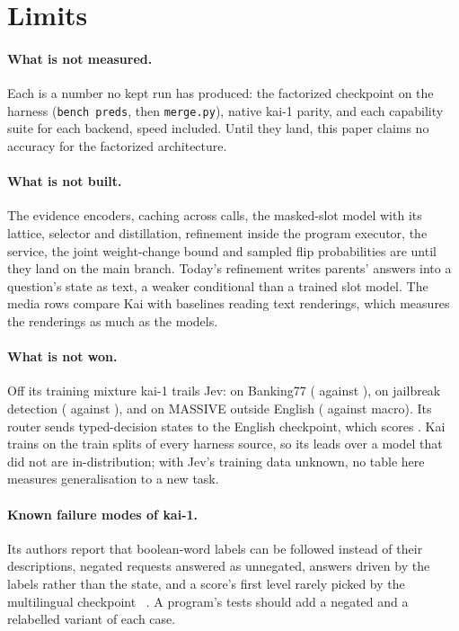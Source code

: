\section{Limits}
\label{sec:limits}

\paragraph{What is not measured.}
Each \ph{} is a number no kept run has produced: the factorized checkpoint on
the harness (\texttt{bench preds}, then \texttt{merge.py}), native kai-1
parity, and each capability suite for each backend, speed included. Until they land, this paper claims no
accuracy for the factorized architecture.

\paragraph{What is not built.}
The evidence encoders, caching across calls, the masked-slot model with its
lattice, selector and distillation, refinement inside the program executor, the
 service, the joint weight-change bound and sampled flip
probabilities are \proposed{} until they land on the main branch. Today's refinement writes
parents' answers into a question's state as text, a weaker conditional than a
trained slot model. The media rows compare Kai with baselines reading text
renderings, which measures the renderings as much as the models.

\paragraph{What is not won.}
Off its training mixture kai-1 trails Jev: on Banking77 ( against
), on jailbreak detection
( against
), and on MASSIVE outside English
( against
 macro). Its router sends typed-decision
states to the English checkpoint, which scores
. Kai trains on the train splits of every
harness source, so its leads over a model that did not are in-distribution;
with Jev's training data unknown, no table here measures generalisation to a
new task.

\paragraph{Known failure modes of kai-1.}
Its authors report that boolean-word labels can be followed instead of their
descriptions, negated requests answered as unnegated,  answers driven
by the labels rather than the state, and a score's first level rarely picked
by the multilingual checkpoint~\cite{laya} \reported. A program's tests should
add a negated and a relabelled variant of each case.

